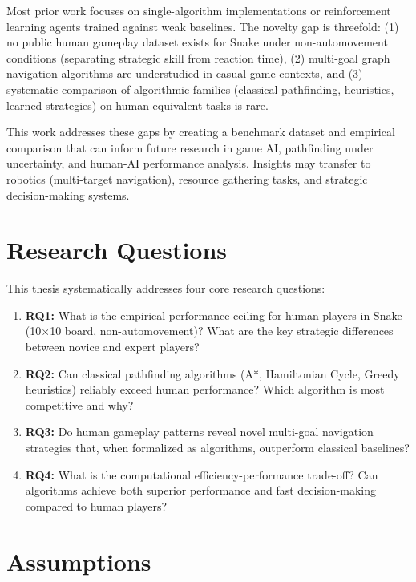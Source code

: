 \documentclass[a4paper]{article}
\begin{document}
Most prior work focuses on single-algorithm implementations or reinforcement learning agents trained against weak baselines. The novelty gap is threefold: (1) no public human gameplay dataset exists for Snake under non-automovement conditions (separating strategic skill from reaction time), (2) multi-goal graph navigation algorithms are understudied in casual game contexts, and (3) systematic comparison of algorithmic families (classical pathfinding, heuristics, learned strategies) on human-equivalent tasks is rare.

This work addresses these gaps by creating a benchmark dataset and empirical comparison that can inform future research in game AI, pathfinding under uncertainty, and human-AI performance analysis. Insights may transfer to robotics (multi-target navigation), resource gathering tasks, and strategic decision-making systems.

\section{Research Questions}

This thesis systematically addresses four core research questions:

\begin{enumerate}
\item \textbf{RQ1:} What is the empirical performance ceiling for human players in Snake (10×10 board, non-automovement)? What are the key strategic differences between novice and expert players?

\item \textbf{RQ2:} Can classical pathfinding algorithms (A*, Hamiltonian Cycle, Greedy heuristics) reliably exceed human performance? Which algorithm is most competitive and why?

\item \textbf{RQ3:} Do human gameplay patterns reveal novel multi-goal navigation strategies that, when formalized as algorithms, outperform classical baselines?

\item \textbf{RQ4:} What is the computational efficiency-performance trade-off? Can algorithms achieve both superior performance and fast decision-making compared to human players?
\end{enumerate}

\section{Assumptions}
\end{document}

